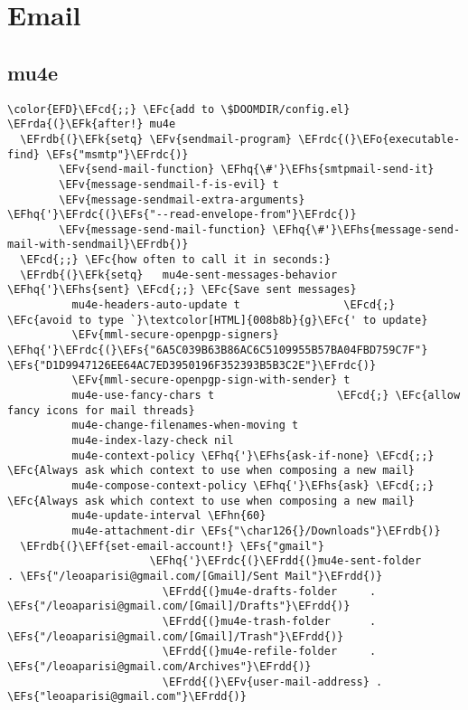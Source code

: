 \documentclass[12pt]{article}
\theoremstyle{plain}%
\theoremstyle{definition}
\theoremstyle{remark}
\newcommand{\EFc}[1]{\textcolor{EFc}{#1}} %
\newcommand{\EFcd}[1]{\textcolor{EFcd}{#1}} %
\newcommand{\EFs}[1]{\textcolor{EFs}{#1}} %
\newcommand{\EFk}[1]{\textcolor{EFk}{#1}} %
\newcommand{\EFf}[1]{\textcolor{EFf}{#1}} %
\newcommand{\EFv}[1]{\textcolor{EFv}{#1}} %
\newcommand{\EFo}[1]{\textcolor{EFo}{#1}} %
\newcommand{\EFhn}[1]{\textcolor{EFhn}{\textbf{#1}}} %
\newcommand{\EFhq}[1]{\textcolor{EFhq}{#1}} %
\newcommand{\EFhs}[1]{\textcolor{EFhs}{#1}} %
\newcommand{\EFrda}[1]{\textcolor{EFrda}{#1}} %
\newcommand{\EFrdb}[1]{\textcolor{EFrdb}{#1}} %
\newcommand{\EFrdc}[1]{\textcolor{EFrdc}{#1}} %
\newcommand{\EFrdd}[1]{\textcolor{EFrdd}{#1}} %
\begin{document}
\section{Email}
\label{sec:orgd4fed9d}
\subsection{mu4e}
\label{sec:orga89e2e9}
\begin{Code}
\begin{Verbatim}
\color{EFD}\EFcd{;;} \EFc{add to \$DOOMDIR/config.el}
\EFrda{(}\EFk{after!} mu4e
  \EFrdb{(}\EFk{setq} \EFv{sendmail-program} \EFrdc{(}\EFo{executable-find} \EFs{"msmtp"}\EFrdc{)}
        \EFv{send-mail-function} \EFhq{\#'}\EFhs{smtpmail-send-it}
        \EFv{message-sendmail-f-is-evil} t
        \EFv{message-sendmail-extra-arguments} \EFhq{'}\EFrdc{(}\EFs{"--read-envelope-from"}\EFrdc{)}
        \EFv{message-send-mail-function} \EFhq{\#'}\EFhs{message-send-mail-with-sendmail}\EFrdb{)}
  \EFcd{;;} \EFc{how often to call it in seconds:}
  \EFrdb{(}\EFk{setq}   mu4e-sent-messages-behavior \EFhq{'}\EFhs{sent} \EFcd{;;} \EFc{Save sent messages}
          mu4e-headers-auto-update t                \EFcd{;} \EFc{avoid to type `}\textcolor[HTML]{008b8b}{g}\EFc{' to update}
          \EFv{mml-secure-openpgp-signers} \EFhq{'}\EFrdc{(}\EFs{"6A5C039B63B86AC6C5109955B57BA04FBD759C7F"} \EFs{"D1D9947126EE64AC7ED3950196F352393B5B3C2E"}\EFrdc{)}
          \EFv{mml-secure-openpgp-sign-with-sender} t
          mu4e-use-fancy-chars t                   \EFcd{;} \EFc{allow fancy icons for mail threads}
          mu4e-change-filenames-when-moving t
          mu4e-index-lazy-check nil
          mu4e-context-policy \EFhq{'}\EFhs{ask-if-none} \EFcd{;;} \EFc{Always ask which context to use when composing a new mail}
          mu4e-compose-context-policy \EFhq{'}\EFhs{ask} \EFcd{;;} \EFc{Always ask which context to use when composing a new mail}
          mu4e-update-interval \EFhn{60}
          mu4e-attachment-dir \EFs{"\char126{}/Downloads"}\EFrdb{)}
  \EFrdb{(}\EFf{set-email-account!} \EFs{"gmail"}
                      \EFhq{'}\EFrdc{(}\EFrdd{(}mu4e-sent-folder       . \EFs{"/leoaparisi@gmail.com/[Gmail]/Sent Mail"}\EFrdd{)}
                        \EFrdd{(}mu4e-drafts-folder     . \EFs{"/leoaparisi@gmail.com/[Gmail]/Drafts"}\EFrdd{)}
                        \EFrdd{(}mu4e-trash-folder      . \EFs{"/leoaparisi@gmail.com/[Gmail]/Trash"}\EFrdd{)}
                        \EFrdd{(}mu4e-refile-folder     . \EFs{"/leoaparisi@gmail.com/Archives"}\EFrdd{)}
                        \EFrdd{(}\EFv{user-mail-address} . \EFs{"leoaparisi@gmail.com"}\EFrdd{)}

\end{Verbatim}
\end{Code}
\end{document}
